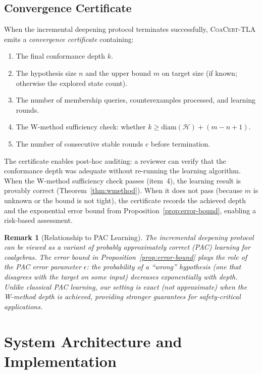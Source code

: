 \documentclass[11pt]{article}
\newtheorem{remark}[theorem]{Remark}
\newcommand{\CoaCert}{\textsc{CoaCert-TLA}}
\newcommand{\diam}{\ensuremath{\mathrm{diam}}}
\begin{document}
\subsection{Convergence Certificate}

When the incremental deepening protocol terminates successfully, \CoaCert{}
emits a \emph{convergence certificate} containing:
\begin{enumerate}[nosep]
\item The final conformance depth $k$.
\item The hypothesis size $n$ and the upper bound $m$ on target size
  (if known; otherwise the explored state count).
\item The number of membership queries, counterexamples processed, and
  learning rounds.
\item The W-method sufficiency check: whether $k \geq \diam(\mathcal{H}) + (m - n + 1)$.
\item The number of consecutive stable rounds $c$ before termination.
\end{enumerate}

The certificate enables post-hoc auditing: a reviewer can verify that the
conformance depth was adequate without re-running the learning algorithm.
When the W-method sufficiency check passes (item~4), the learning result is
provably correct (Theorem~\ref{thm:wmethod}).
When it does not pass (because $m$ is unknown or the bound is not tight),
the certificate records the achieved depth and the exponential error bound
from Proposition~\ref{prop:error-bound}, enabling a risk-based assessment.

\begin{remark}[Relationship to PAC Learning]
The incremental deepening protocol can be viewed as a variant of
\emph{probably approximately correct} (PAC) learning for coalgebras.
The error bound in Proposition~\ref{prop:error-bound} plays the role of
the PAC error parameter $\epsilon$: the probability of a ``wrong''
hypothesis (one that disagrees with the target on some input) decreases
exponentially with depth.
Unlike classical PAC learning, our setting is exact (not approximate)
when the W-method depth is achieved, providing stronger guarantees for
safety-critical applications.
\end{remark}


\section{System Architecture and Implementation}
\label{sec:architecture}
\end{document}
